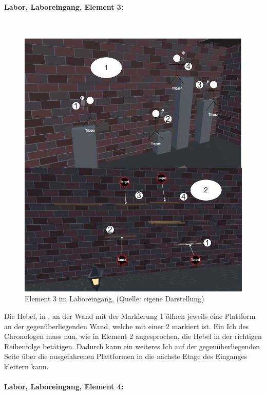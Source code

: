 \paragraph{Labor, Laboreingang, Element 3:}\label{p:lle3}
~
\begin{figure}[ht]
\centering
\includegraphics[width=0.8\linewidth]{content/pictures/Raetsel-L02_R02_R03.jpg}
\caption{Element 3 im Laboreingang, (Quelle: eigene Darstellung)}
\label{fig:L02_R02_R03}
\end{figure}

Die Hebel, in , an der Wand mit der Markierung 1 öffnen jeweils eine Plattform an der gegenüberliegenden Wand, welche mit einer 2 markiert ist. Ein Ich des Chronologen muss nun, wie in Element 2 angesprochen, die Hebel in der richtigen Reihenfolge betätigen. Dadurch kann ein weiteres Ich auf der gegenüberliegenden Seite über die ausgefahrenen Plattformen in die nächste Etage des Einganges klettern kann. 

\paragraph{Labor, Laboreingang, Element 4:}\label{p:lle4}


